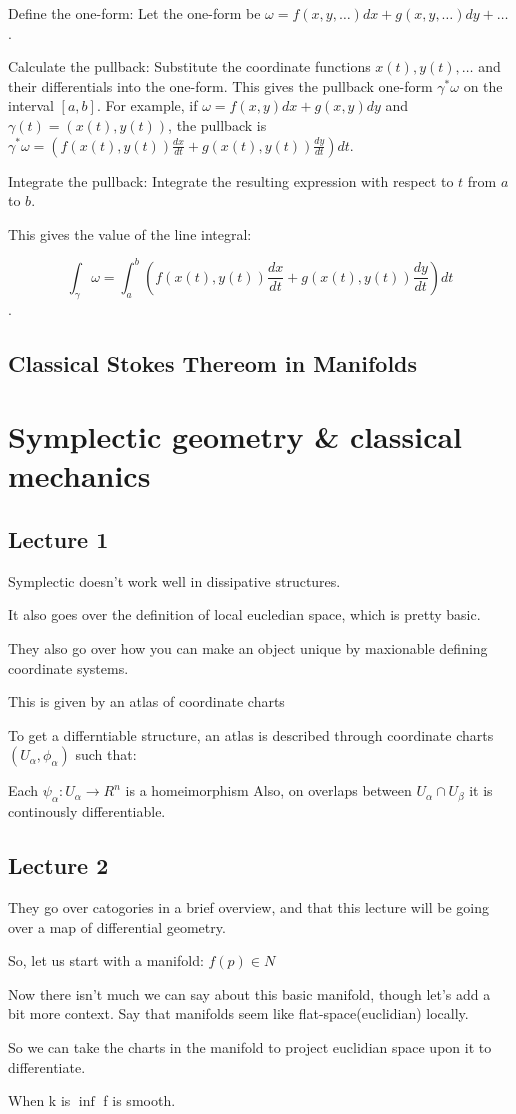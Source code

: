 Define the one-form: Let the one-form be \(\omega =f(x,y,\dots )dx+g(x,y,\dots )dy+\dots \). 

Calculate the pullback: Substitute the coordinate functions \(x(t),y(t),\dots \) and their differentials into the one-form. This gives the pullback one-form \(\gamma ^{*}\omega \) on the interval \([a,b]\). For example, if \(\omega =f(x,y)dx+g(x,y)dy\) and \(\gamma (t)=(x(t),y(t))\), the pullback is \(\gamma ^{*}\omega =(f(x(t),y(t))\frac{dx}{dt}+g(x(t),y(t))\frac{dy}{dt})dt\).

Integrate the pullback: Integrate the resulting expression with respect to \(t\) from \(a\) to \(b\). 

This gives the value of the line integral: 

\[\int _{\gamma }\omega =\int _{a}^{b}(f(x(t),y(t))\frac{dx}{dt}+g(x(t),y(t))\frac{dy}{dt})dt\].

\subsection{Classical Stokes Thereom in Manifolds}

\section{Symplectic geometry \& classical mechanics}
\subsection{Lecture 1}
Symplectic doesn't work well in dissipative structures.

It also goes over the definition of local eucledian space, which is pretty basic.

They also go over how you can make an object unique by maxionable defining coordinate systems. 

This is given by an atlas of coordinate charts 

To get a differntiable structure, an atlas is described through coordinate charts $(U_\alpha, \phi_\alpha)$ such that:

Each $\psi_\alpha: U_\alpha \to R^n$ is a homeimorphism
Also, on overlaps between $U_\alpha \cap U_\beta$ it is continously differentiable.

\subsection{Lecture 2}
They go over catogories in a brief overview, and that this lecture will be going over a map of differential geometry. 

So, let us start with a manifold: $ f(p)\in N$

Now there isn't much we can say about this basic manifold, though let's add a bit more context. Say that manifolds seem like flat-space(euclidian) locally.

So we can take the charts in the manifold to project euclidian space upon it to differentiate. 

When k is $\inf$ f is smooth. 
